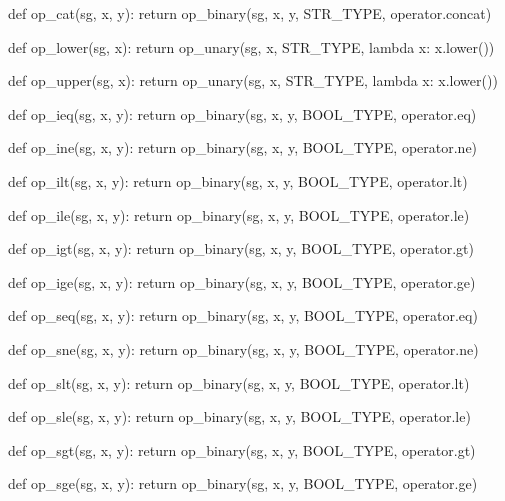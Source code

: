 \begin{dispPy}
def op_cat(sg, x, y):
    return op_binary(sg, x, y, STR_TYPE, operator.concat)

def op_lower(sg, x):
    return op_unary(sg, x, STR_TYPE, lambda x: x.lower())

def op_upper(sg, x):
    return op_unary(sg, x, STR_TYPE, lambda x: x.lower())

def op_ieq(sg, x, y):
    return op_binary(sg, x, y, BOOL_TYPE, operator.eq)

def op_ine(sg, x, y):
    return op_binary(sg, x, y, BOOL_TYPE, operator.ne)

def op_ilt(sg, x, y):
    return op_binary(sg, x, y, BOOL_TYPE, operator.lt)

def op_ile(sg, x, y):
    return op_binary(sg, x, y, BOOL_TYPE, operator.le)

def op_igt(sg, x, y):
    return op_binary(sg, x, y, BOOL_TYPE, operator.gt)

def op_ige(sg, x, y):
    return op_binary(sg, x, y, BOOL_TYPE, operator.ge)

def op_seq(sg, x, y):
    return op_binary(sg, x, y, BOOL_TYPE, operator.eq)

def op_sne(sg, x, y):
    return op_binary(sg, x, y, BOOL_TYPE, operator.ne)

def op_slt(sg, x, y):
    return op_binary(sg, x, y, BOOL_TYPE, operator.lt)

def op_sle(sg, x, y):
    return op_binary(sg, x, y, BOOL_TYPE, operator.le)

def op_sgt(sg, x, y):
    return op_binary(sg, x, y, BOOL_TYPE, operator.gt)

def op_sge(sg, x, y):
    return op_binary(sg, x, y, BOOL_TYPE, operator.ge)


\end{dispPy}
